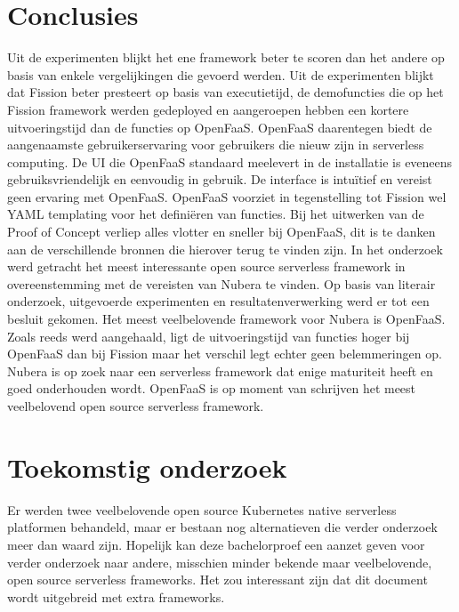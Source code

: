 \documentclass[a0,portrait]{a0poster}
\begin{document}
\begin{multicols}{2}
\section*{Conclusies}
\color{black}
Uit de experimenten blijkt het ene framework beter te scoren dan het andere op basis van enkele vergelijkingen die gevoerd werden. Uit de experimenten blijkt dat Fission beter presteert op basis van executietijd, de demofuncties die op het Fission framework werden gedeployed en aangeroepen hebben een kortere uitvoeringstijd dan de functies op OpenFaaS. OpenFaaS daarentegen biedt de aangenaamste gebruikerservaring voor gebruikers die nieuw zijn in serverless computing. De UI die OpenFaaS standaard meelevert in de installatie is eveneens gebruiksvriendelijk en eenvoudig in gebruik. De interface is intuïtief en vereist geen ervaring met OpenFaaS. OpenFaaS voorziet in tegenstelling tot Fission wel YAML templating voor het definiëren van functies. Bij het uitwerken van de Proof of Concept verliep alles vlotter en sneller bij OpenFaaS, dit is te danken aan de verschillende bronnen die hierover terug te vinden zijn. In het onderzoek werd getracht het meest interessante open source serverless framework in overeenstemming met de vereisten van Nubera te vinden. Op basis van literair onderzoek, uitgevoerde experimenten en resultatenverwerking werd er tot een besluit gekomen. Het meest veelbelovende framework voor Nubera is OpenFaaS. Zoals reeds werd aangehaald, ligt de uitvoeringstijd van functies hoger bij OpenFaaS dan bij Fission maar het verschil legt echter geen belemmeringen op. Nubera is op zoek naar een serverless framework dat enige maturiteit heeft en goed onderhouden wordt. OpenFaaS is op moment van schrijven het meest veelbelovend open source serverless framework.

\color{HoGentAccent1} 
\section*{Toekomstig onderzoek}
\color{black}
Er werden twee veelbelovende open source Kubernetes native serverless platformen behandeld, maar er bestaan nog alternatieven die verder onderzoek meer dan waard zijn. Hopelijk kan deze bachelorproef een aanzet geven voor verder onderzoek naar andere, misschien minder bekende maar veelbelovende, open source serverless frameworks. Het zou interessant zijn dat dit document wordt uitgebreid met extra frameworks.
\end{multicols}
\end{document}
